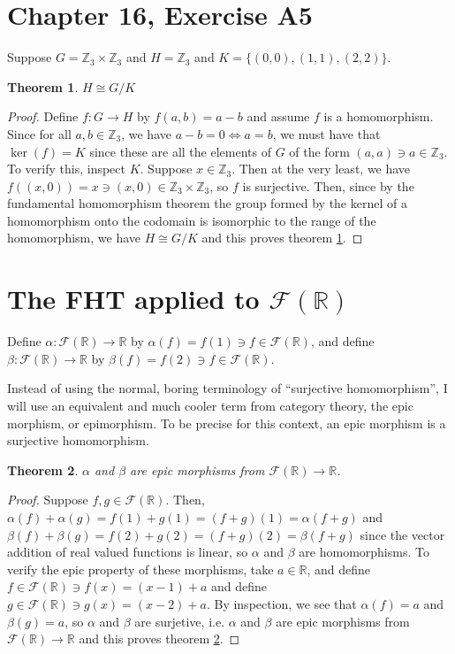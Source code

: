 \documentclass[12pt]{article}
\newcommand{\reals}{\mathbb{R}}
\newcommand{\ints}{\mathbb{Z}}
\newcommand{\freals}{\mathcal{F}(\reals)}
\newtheorem{thm}{Theorem}
\begin{document}
\section{Chapter 16, Exercise A5}

Suppose $G = \ints_3 \times \ints_3$ and $H = \ints_3$ and $K = \{ (0,0), (1,1), (2,2) \}$.


\begin{thm} \label{thm3}
	$H \cong G/K$
\end{thm}

\begin{proof}
	Define $f:G \to H$ by $f(a,b) = a - b$
	and assume $f$ is a homomorphism.
	Since for all $a,b \in \ints_3$,
	we have $a - b = 0 \iff a = b$,
	we must have that $\ker(f) = K$ since these
	are all the elements of $G$ of the form $(a,a) \ni a \in \ints_3$.
	To verify this, inspect $K$.
	Suppose $x \in \ints_3$.
	Then at the very least, we have $f((x,0)) = x \ni (x,0) \in \ints_3 \times \ints_3$,
	so $f$ is surjective.
	Then, since by the fundamental homomorphism theorem 
	the group formed by the kernel of a homomorphism
	onto the codomain
	is isomorphic to the range of the homomorphism,
	we have $H \cong G/K$ and this proves theorem \ref{thm3}.
\end{proof}

\section{The FHT applied to $\freals$}

Define $\alpha: \freals \to \reals$ by $\alpha(f) = f(1) \ni f \in \freals$,
and define $\beta: \freals \to \reals$ by $\beta(f) = f(2) \ni f \in \freals$.

Instead of using the normal, boring terminology of ``surjective homomorphism'',
I will use an equivalent and much cooler term from category theory,
the epic morphism, or epimorphism. To be precise for this context, an epic morphism is
a surjective homomorphism.

\begin{thm} \label{thm4}
	$\alpha$ and $\beta$ are epic morphisms from $\freals \to \reals$.
\end{thm}

\begin{proof}
	Suppose $f,g \in \freals$.
	Then, $\alpha(f) + \alpha(g) = f(1) + g(1)  = (f + g)(1) = \alpha(f + g)$
	and $\beta(f) + \beta(g) = f(2) + g(2) = (f + g)(2) = \beta(f + g)$
	since the vector addition of real valued functions is linear,
	so $\alpha$ and $\beta$ are homomorphisms.
	To verify the epic property of these morphisms,
	take $a \in \reals$,
	and define $f \in \freals \ni f(x) = (x - 1) + a$
	and define $g \in \freals \ni g(x) = (x - 2) + a$.
	By inspection, we see that $\alpha(f) = a$ and $\beta(g) = a$,
	so $\alpha$ and $\beta$ are surjetive,
	i.e. $\alpha$ and $\beta$ are epic morphisms from $\freals \to \reals$
	and this proves theorem \ref{thm4}.
\end{proof}
\end{document}
